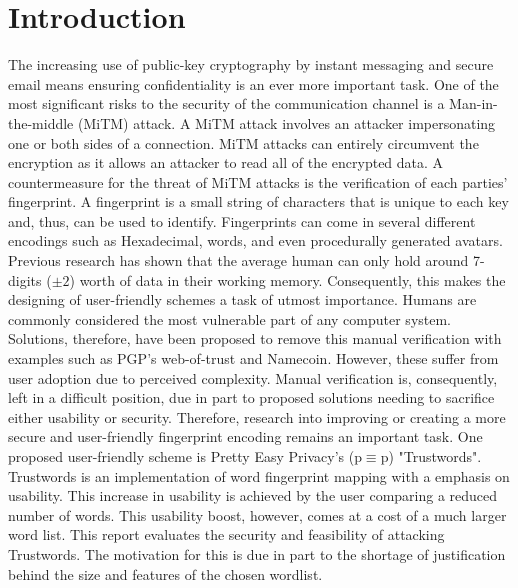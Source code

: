 \section{Introduction}

The increasing use of public-key cryptography by instant messaging and secure email means ensuring confidentiality is an ever more important task.
One of the most significant risks to the security of the communication channel is a Man-in-the-middle (MiTM) attack. A MiTM attack involves an attacker impersonating one or both sides of a connection. MiTM attacks can entirely circumvent the encryption as it allows an attacker to read all of the encrypted data.
A countermeasure for the threat of MiTM attacks is the verification of each parties’ fingerprint. A fingerprint is a small string of characters that is unique to each key and, thus, can be used to identify.
Fingerprints can come in several different encodings such as Hexadecimal, words, and even procedurally generated avatars. Previous research has shown that the average human can only hold around 7-digits ($\pm 2$) worth of data in their working memory\cite{miller1956magical}. Consequently, this makes the designing of user-friendly schemes a task of utmost importance.
Humans are commonly considered the most vulnerable part of any computer system. Solutions, therefore, have been proposed to remove this manual verification with examples such as PGP's web-of-trust\cite{callas1998openpgp} and Namecoin\cite{kalodner2015empirical}. However, these suffer from user adoption due to perceived complexity. Manual verification is, consequently, left in a difficult position, due in part to proposed solutions needing to sacrifice either usability or security. Therefore, research into improving or creating a more secure and user-friendly fingerprint encoding remains an important task.
One proposed user-friendly scheme is Pretty Easy Privacy's (p$\equiv$p) "Trustwords". Trustwords is an implementation of word fingerprint mapping with a emphasis on usability. This increase in usability is achieved by the user comparing a reduced number of words. This usability boost, however, comes at a cost of a much larger word list.
This report evaluates the security and feasibility of attacking Trustwords. The motivation for this is due in part to the shortage of justification behind the size and features of the chosen wordlist.